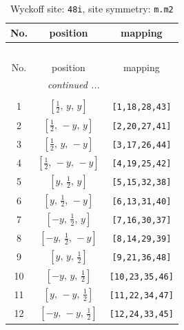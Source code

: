 \documentclass[fleqn,8pt]{jsarticle}
\begin{document}
\begin{longtable}{ccc}
\caption{Wyckoff site: {\tt 48i}, site symmetry: {\tt m.m2}}
 \\
 \hline \hline
No. & position & mapping \\ \hline \endfirsthead

\multicolumn{2}{l}{\tablename\ \thetable{}} \\
 \hline \hline
No. & position & mapping \\ \hline \endhead

 \hline \hline
\multicolumn{2}{r}{\footnotesize\it continued ...} \\ \endfoot

 \hline \hline
\multicolumn{2}{r}{} \\ \endlastfoot

1 & $\left[ \frac{1}{2},\, y,\, y \right]$ & {\tt [1,18,28,43]} \\ \hline
2 & $\left[ \frac{1}{2},\, - y,\, y \right]$ & {\tt [2,20,27,41]} \\ \hline
3 & $\left[ \frac{1}{2},\, y,\, - y \right]$ & {\tt [3,17,26,44]} \\ \hline
4 & $\left[ \frac{1}{2},\, - y,\, - y \right]$ & {\tt [4,19,25,42]} \\ \hline
5 & $\left[ y,\, \frac{1}{2},\, y \right]$ & {\tt [5,15,32,38]} \\ \hline
6 & $\left[ y,\, \frac{1}{2},\, - y \right]$ & {\tt [6,13,31,40]} \\ \hline
7 & $\left[ - y,\, \frac{1}{2},\, y \right]$ & {\tt [7,16,30,37]} \\ \hline
8 & $\left[ - y,\, \frac{1}{2},\, - y \right]$ & {\tt [8,14,29,39]} \\ \hline
9 & $\left[ y,\, y,\, \frac{1}{2} \right]$ & {\tt [9,21,36,48]} \\ \hline
10 & $\left[ - y,\, y,\, \frac{1}{2} \right]$ & {\tt [10,23,35,46]} \\ \hline
11 & $\left[ y,\, - y,\, \frac{1}{2} \right]$ & {\tt [11,22,34,47]} \\ \hline
12 & $\left[ - y,\, - y,\, \frac{1}{2} \right]$ & {\tt [12,24,33,45]} \\
\end{longtable}
\renewcommand{\arraystretch}{1.2}
\end{document}
